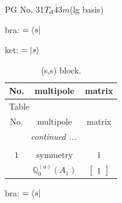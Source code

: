 \documentclass[fleqn,8pt,landscape]{jsarticle}
\begin{document}
\setcounter{MaxMatrixCols}{32}

\renewcommand{\tablename}{Table~}
\renewcommand{\figurename}{Figure~}
\begin{center}
\LARGE
PG No. 31\quad$T_{\rm d}$\quad$\bar{4}3m$\quad[ cubic ] (lg basis)
\end{center}
bra: $=\bra{s}$

\noindent
ket: $=\ket{s}$
\renewcommand{\arraystretch}{1.6}
\begin{longtable}{ccc}
\caption{(s,s) block.}
 \\
 \hline \hline
No. & multipole & matrix \\ \hline \endfirsthead

\multicolumn{2}{l}{\tablename\ \thetable{}} \\
 \hline \hline
No. & multipole & matrix \\ \hline \endhead

 \hline \hline
\multicolumn{2}{r}{\footnotesize\it continued ...} \\ \endfoot

 \hline \hline
\multicolumn{2}{r}{} \\ \endlastfoot

$ 1 $ & $ \text{symmetry} $ & $ 1 $ \\
$  $ & $ \mathbb{Q}_{0}^{(a)}(A_{1}) $ & $ \begin{bmatrix} 1 \end{bmatrix} $ \\ \hline
\end{longtable}
bra: $=\bra{s}$
\end{document}
